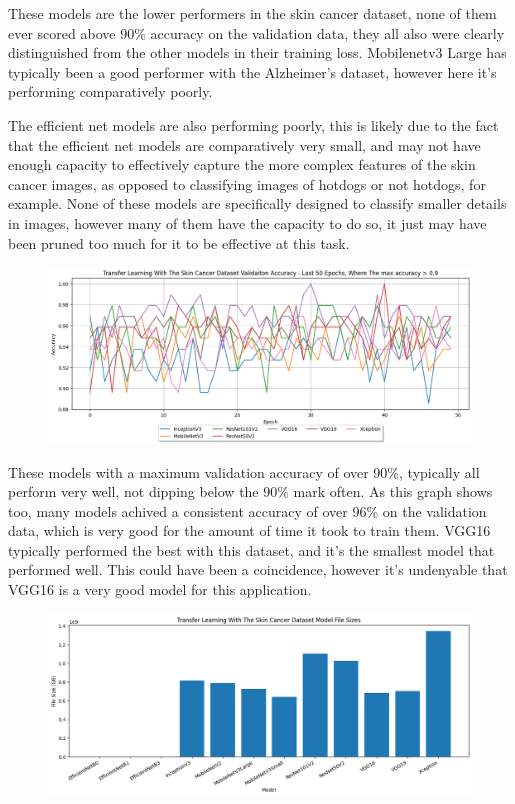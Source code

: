 \documentclass[]{final_report}
\begin{document}
These models are the lower performers in the skin cancer dataset, none of them ever scored above 90\% accuracy on the validation data, they all also were clearly distinguished from the other models in their training loss. Mobilenetv3 Large has typically been a good performer with the Alzheimer's dataset, however here it's performing comparatively poorly.

The efficient net models are also performing poorly, this is likely due to the fact that the efficient net models are comparatively very small, and may not have enough capacity to effectively capture the more complex features of the skin cancer images, as opposed to classifying images of hotdogs or not hotdogs, for example. None of these models are specifically designed to classify smaller details in images, however many of them have the capacity to do so, it just may have been pruned too much for it to be effective at this task.

\begin{figure}[ht!]
  \centering
  \includegraphics[width=1\textwidth]{images/Skin-cancer-validation-accuracy-last-50-high-performers.png}
\end{figure}

These models with a maximum validation accuracy of over 90\%, typically all perform very well, not dipping below the 90\% mark often. As this graph shows too, many models achived a consistent accuracy of over 96\% on the validation data, which is very good for the amount of time it took to train them. VGG16 typically performed the best with this dataset, and it's the smallest model that performed well. This could have been a coincidence, however it's undenyable that VGG16 is a very good model for this application.

\begin{figure}[ht!]
  \centering
  \includegraphics[width=1\textwidth]{images/skin-cancer-model-sizes-graph.png}
\end{figure}
\end{document}
